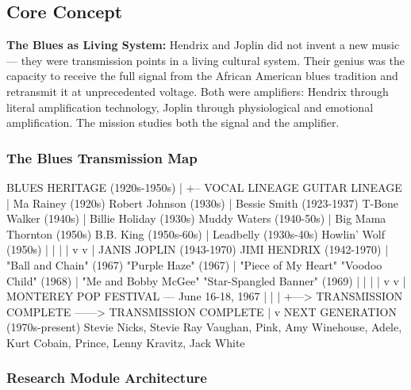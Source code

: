 \documentclass[11pt,letterpaper]{article}
\begin{document}
\subsection{Core Concept}

\textbf{The Blues as Living System:} Hendrix and Joplin did not invent a new music --- they were transmission points in a living cultural system. Their genius was the capacity to receive the full signal from the African American blues tradition and retransmit it at unprecedented voltage. Both were amplifiers: Hendrix through literal amplification technology, Joplin through physiological and emotional amplification. The mission studies both the signal and the amplifier.

\subsubsection{The Blues Transmission Map}

\begin{asciibox}
BLUES HERITAGE (1920s-1950s)
  |
  +-- VOCAL LINEAGE             GUITAR LINEAGE
  |   Ma Rainey (1920s)         Robert Johnson (1930s)
  |   Bessie Smith (1923-1937)  T-Bone Walker (1940s)
  |   Billie Holiday (1930s)    Muddy Waters (1940-50s)
  |   Big Mama Thornton (1950s) B.B. King (1950s-60s)
  |   Leadbelly (1930s-40s)     Howlin' Wolf (1950s)
  |           |                         |
  |           v                         v
  |    JANIS JOPLIN (1943-1970)   JIMI HENDRIX (1942-1970)
  |    "Ball and Chain" (1967)    "Purple Haze" (1967)
  |    "Piece of My Heart"        "Voodoo Child" (1968)
  |    "Me and Bobby McGee"       "Star-Spangled Banner" (1969)
  |           |                         |
  |           v                         v
  |    MONTEREY POP FESTIVAL --- June 16-18, 1967
  |           |                         |
  +---> TRANSMISSION COMPLETE ------> TRANSMISSION COMPLETE
                |
                v
        NEXT GENERATION (1970s-present)
        Stevie Nicks, Stevie Ray Vaughan, Pink,
        Amy Winehouse, Adele, Kurt Cobain,
        Prince, Lenny Kravitz, Jack White
\end{asciibox}

\subsubsection{Research Module Architecture}
\end{document}
